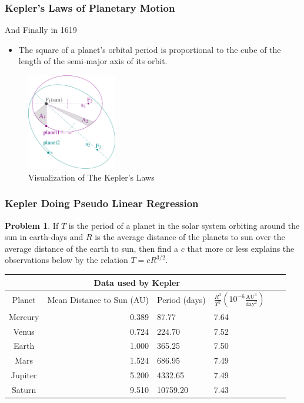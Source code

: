 \documentclass{beamer}
\theoremstyle{definition}
\newtheorem {Pro} [Thm]{Problem}
\theoremstyle{remark}
\begin{document}
  \begin{frame}
    \frametitle{Kepler's Laws of Planetary Motion}
    And Finally in 1619
    \pause
    \begin{itemize}[<+->]
      \item The square of a planet's orbital period is proportional to the cube of the length of the semi-major axis of its orbit.
    \end{itemize}
      \begin{figure}
        \centering
        \includegraphics[width=0.35\textwidth]{./data/image/kepler_laws_diagram.pdf}
      \caption{Visualization of The Kepler's Laws}
      \label{image:kepler_law_planetary}
      \end{figure}
    \end{frame}

  \begin{frame}
    \frametitle{Kepler Doing Pseudo Linear Regression}
    \begin{Pro}
    If $T$ is the period of a planet in the solar system orbiting around the sun in earth-days and 
    $R$ is the average distance of the planets to sun over the average distance of the earth to sun,
     then find a $c$ that more or less explains 
    the observations below by the relation $T=cR^{3/2}$.
      
    \end{Pro}
    \begin{tabular}{|c|r|p{1.3cm}|p{2cm}|p{2cm}|p{2cm}|}
      \hline
      \multicolumn{4}{|c|}{Data used by Kepler} \\
      \hline
      Planet & Mean Distance to Sun (AU) & Period (days) &$\frac{R^3}{T^2}(10^{-6}\frac{\text{AU}^3}{\text{day}^2})$\\
      \hline
      Mercury   & 0.389   & 87.77    & 7.64 \\
      Venus     &   0.724 & 224.70   & 7.52 \\
      Earth     & 1.000   & 365.25   & 7.50 \\
      Mars      & 1.524   & 686.95   & 7.49 \\
      Jupiter   &   5.200 & 4332.65  & 7.49 \\
      Saturn    & 9.510   & 10759.20 & 7.43 \\
      \hline
     \end{tabular}\label{tab:kepler_tycho_data}
    \end{frame}
\end{document}
